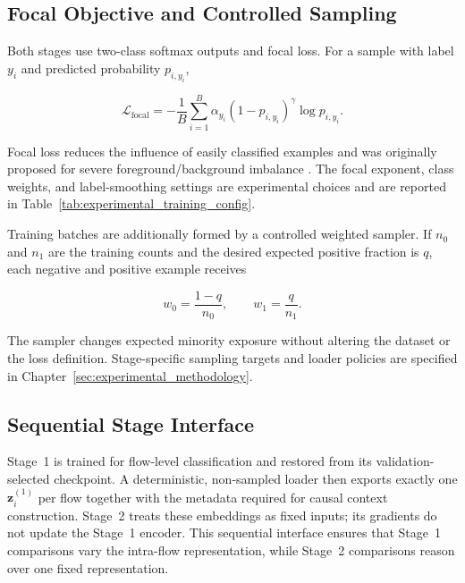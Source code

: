 \documentclass[11pt,fleqn]{report}
\begin{document}
\subsection{Focal Objective and Controlled Sampling}
\label{subsubsec:focal_training}

Both stages use two-class softmax outputs and focal loss. For a sample with label $y_i$ and predicted probability $p_{i,y_i}$,

\begin{equation}
    \mathcal{L}_{\mathrm{focal}}
    =-\frac{1}{B}
      \sum_{i=1}^{B}
      \alpha_{y_i}
      \left(1-p_{i,y_i}\right)^{\gamma}
      \log p_{i,y_i}.
    \label{eq:method_focal_loss}
\end{equation}

Focal loss reduces the influence of easily classified examples and was originally proposed for severe foreground/background imbalance \cite{Lin2017FocalLoss}. The focal exponent, class weights, and label-smoothing settings are experimental choices and are reported in Table~\ref{tab:experimental_training_config}.

Training batches are additionally formed by a controlled weighted sampler. If $n_0$ and $n_1$ are the training counts and the desired expected positive fraction is $q$, each negative and positive example receives

\begin{equation}
    w_0=\frac{1-q}{n_0},
    \qquad
    w_1=\frac{q}{n_1}.
    \label{eq:controlled_sampler}
\end{equation}

The sampler changes expected minority exposure without altering the dataset or the loss definition. Stage-specific sampling targets and loader policies are specified in Chapter~\ref{sec:experimental_methodology}.

\subsection{Sequential Stage Interface}
\label{subsec:sequential_stage_interface}

Stage~1 is trained for flow-level classification and restored from its validation-selected checkpoint. A deterministic, non-sampled loader then exports exactly one $\mathbf{z}^{(1)}_i$ per flow together with the metadata required for causal context construction. Stage~2 treats these embeddings as fixed inputs; its gradients do not update the Stage~1 encoder. This sequential interface ensures that Stage~1 comparisons vary the intra-flow representation, while Stage~2 comparisons reason over one fixed representation.
\end{document}
